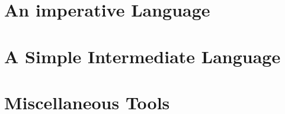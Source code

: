 \documentclass[9pt]{book}
\begin{document}





\chapter{An imperative Language}





\chapter{A Simple Intermediate Language}



 \chapter{Miscellaneous Tools}
 
 
 
 
 
 
 
 
  






\printindex
\end{document}
